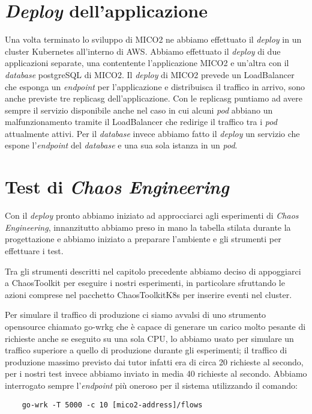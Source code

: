 \section{\textit{Deploy} dell'applicazione}
Una volta terminato lo sviluppo di MICO2 ne abbiamo effettuato il \textit{deploy} in un cluster Kubernetes all'interno di AWS.
Abbiamo effettuato il \textit{deploy} di due applicazioni separate, una contentente l'applicazione MICO2 e un'altra con il \textit{database} postgreSQL di MICO2.
Il \textit{deploy} di MICO2 prevede un LoadBalancer che esponga un \textit{endpoint} per l'applicazione e distribuisca il traffico in arrivo, sono anche previste tre \gls{replicasg} dell'applicazione.
Con le \gls{replicasg} puntiamo ad avere sempre il servizio disponibile anche nel caso in cui alcuni \textit{pod} abbiano un malfunzionamento tramite il LoadBalancer che redirige il traffico tra i \textit{pod} attualmente attivi.
Per il \textit{database} invece abbiamo fatto il \textit{deploy} un servizio che espone l'\textit{endpoint} del \textit{database} e una sua sola istanza in un \textit{pod}.

\section{Test di \textit{Chaos Engineering}}
Con il \textit{deploy} pronto abbiamo iniziato ad approcciarci agli esperimenti di \textit{Chaos Engineering}, innanzitutto abbiamo preso in mano la tabella stilata durante la progettazione e abbiamo iniziato a preparare l'ambiente e gli strumenti per effettuare i test.

Tra gli strumenti descritti nel capitolo precedente abbiamo deciso di appoggiarci a ChaosToolkit per eseguire i nostri esperimenti, in particolare sfruttando le azioni comprese nel pacchetto ChaosToolkitK8s per inserire eventi nel cluster.

Per simulare il traffico di produzione ci siamo avvalsi di uno strumento opensource chiamato \gls{go-wrkg} che è capace di generare un carico molto pesante di richieste anche se eseguito su una sola CPU, lo abbiamo usato per simulare un traffico superiore a quello di produzione durante gli esperimenti; il traffico di produzione massimo previsto dai tutor infatti era di circa 20 richieste al secondo, per i nostri test invece abbiamo inviato in media 40 richieste al secondo.
Abbiamo interrogato sempre l'\textit{endpoint} più oneroso per il sistema utilizzando il comando:
\begin{verbatim}
    go-wrk -T 5000 -c 10 [mico2-address]/flows
\end{verbatim}

